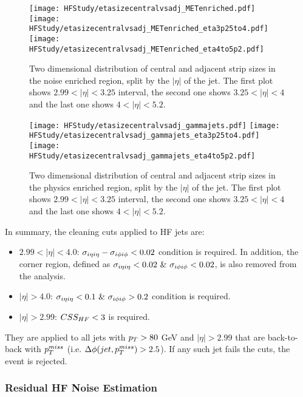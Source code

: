 \begin{figure}
    \centering
    \texttt{[image: HFStudy/etasizecentralvsadj\_METenriched.pdf]}
    \texttt{[image: HFStudy/etasizecentralvsadj\_METenriched\_eta3p25to4.pdf]}
    \texttt{[image: HFStudy/etasizecentralvsadj\_METenriched\_eta4to5p2.pdf]}
    \caption{Two dimensional distribution of central and adjacent strip sizes in the noise enriched region, split by the $|\eta|$ of the jet. The first plot shows 
    $2.99 < |\eta| < 3.25$ interval, the second one shows $3.25 < |\eta| < 4$ and the last one shows $4 < |\eta| < 5.2$.}
    \label{fig:stripsize_noise_enriched}
\end{figure}

\begin{figure}
    \centering
    \texttt{[image: HFStudy/etasizecentralvsadj\_gammajets.pdf]}
    \texttt{[image: HFStudy/etasizecentralvsadj\_gammajets\_eta3p25to4.pdf]}
    \texttt{[image: HFStudy/etasizecentralvsadj\_gammajets\_eta4to5p2.pdf]}
    \caption{Two dimensional distribution of central and adjacent strip sizes in the physics enriched region, split by the $|\eta|$ of the jet. The first plot shows 
    $2.99 < |\eta| < 3.25$ interval, the second one shows $3.25 < |\eta| < 4$ and the last one shows $4 < |\eta| < 5.2$.}
    \label{fig:stripsize_phys_enriched}
\end{figure}


In summary, the cleaning cuts applied to HF jets are:
\begin{itemize}
    \item $2.99 < |\eta| < 4.0$: $\sigma_{i\eta i\eta} - \sigma_{i\phi i\phi} < 0.02$ condition is required. In addition, the corner region, defined as $\sigma_{i\eta i\eta} < 0.02 \ \& \ \sigma_{i\phi i\phi} < 0.02$,
    is also removed from the analysis.
    \item $|\eta| > 4.0$: $\sigma_{i\eta i\eta} < 0.1 \ \& \ \sigma_{i\phi i\phi} > 0.2$ condition is required.
    \item $|\eta| > 2.99$: $CSS_{HF} < 3$ is required.
\end{itemize}

They are applied to all jets with $p_T > 80$ GeV and $|\eta| > 2.99$ that are back-to-back with $p_T^{miss}$
(i.e. $\Delta\phi(jet,p_T^{miss}) > 2.5$). If any such jet fails the cuts, the event is rejected. 


\subsubsection{Residual HF Noise Estimation}
\label{subsubsec:hf_noise_est}

